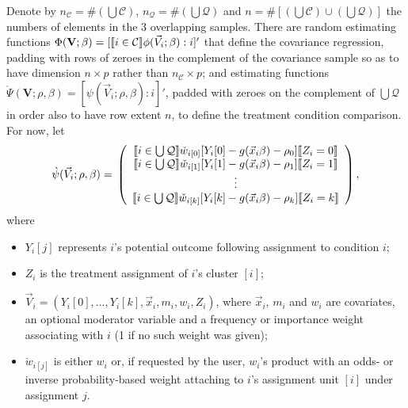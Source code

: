 \documentclass{article}
\DeclarePairedDelimiter{\indicator}{\llbracket}{\rrbracket}
\newcommand{\owt}[1][{[z_{i}]}]{\ensuremath{\check{w}_{i#1}}}
\begin{document}
Denote by $n_{\mathcal{C}}= \# \left( \bigcup \mathcal{C}\right)$,
$n_{\mathcal{Q}}= \# \left( \bigcup \mathcal{Q}\right)$ and
$n = \# \left[\left( \bigcup \mathcal{C}\right) \cup \left(\bigcup
    \mathcal{Q}\right)\right]$ the numbers of elements in the 3
overlapping samples. There are random estimating functions
$\Phi(\mathbf{V}; \beta ) = [\indicator{ i \in
  \mathcal{C}}\phi(\vec{V}_{i}; \beta) : i]'$ that define the covariance
regression, padding with rows of zeroes in
the complement of the covariance sample so
as to have dimension $n \times p$ rather than $n_{\mathcal{C}}\times
p$; and estimating functions 
$\grave{\Psi}(\mathbf{V}; \rho, \beta) = [\psi(\vec{V}_{i}; \rho,
\beta): i]'$, padded with zeroes on the complement of $\bigcup
\mathcal{Q}$ in order also to have row extent $n$, to define the
treatment condition comparison.  For now, let
\begin{equation}
         \label{eq:5}
         \grave{\psi}(\vec{V}_{i}; \rho, \beta) =\\
         \left( \begin{array}{c}
           \indicator{i \in \bigcup \mathcal{Q}}\owt[{[0]}] [Y_{i}[0] - g(\vec{x}_{i}\beta)-
                  \rho_{0}]\indicator{Z_{i}=0}\\
           \indicator{i \in \bigcup \mathcal{Q}}\owt[{[1]}] [Y_{i}[1] - g(\vec{x}_{i}\beta)-
                  \rho_{1}]\indicator{Z_{i}=1}\\
                  \vdots \\
           \indicator{i \in \bigcup \mathcal{Q}}\owt[{[k]}] [Y_{i}[k] - g(\vec{x}_{i}\beta)-
                  \rho_{k}]\indicator{Z_{i}=k}\\
                \end{array}\right),
\end{equation}
where
\begin{itemize}
\item $Y_{i}[j]$ represents $i$'s potential outcome following
  assignment to condition $i$;
\item $Z_{i}$ is the treatment assignment of $i$'s cluster $[i]$;
\item $\vec{V}_{i} = (Y_{i}[0],\ldots, Y_{i}[k], \vec{x}_{i}, m_{i}, w_{i}, Z_{i})$, where $\vec{x}_{i}$, $m_{i}$ and $w_{i}$ are covariates, an optional moderator variable and a
  frequency or importance weight associating with $i$ (1 if no such weight was
  given); 
\item $\owt[{[j]}]$ is either $w_i$ or, 
   if requested by the user, $w_{i}$'s product with an
  odds- or inverse probability-based weight attaching to $i$'s
  assignment unit $[i]$ under assignment $j$.
\end{itemize}
\end{document}
